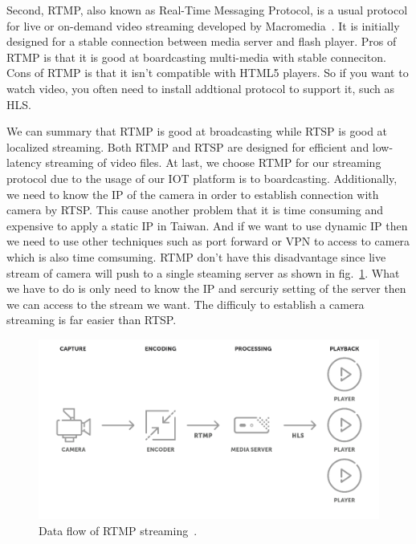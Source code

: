 Second, RTMP, also known as Real-Time Messaging Protocol, is a usual protocol for live or on-demand video streaming developed by Macromedia~\cite{rtmp-inventor}. It is initially designed for a stable connection between media server and flash player. Pros of RTMP is that it is good at boardcasting multi-media with stable conneciton. Cons of RTMP is that it isn’t compatible with HTML5 players. So if you want to watch video, you often need to install addtional protocol to support it, such as HLS.

We can summary that RTMP is good at broadcasting while RTSP is good at localized streaming. Both RTMP and RTSP are designed for efficient and low-latency streaming of video files. At last, we choose RTMP for our streaming protocol due to the usage of our IOT platform is to boardcasting. Additionally, we need to know the IP of the camera in order to establish connection with camera by RTSP. This cause another problem that it is time consuming and expensive to apply  a static IP in Taiwan. And if we want to use dynamic IP then we need to use other techniques such as port forward or VPN to access to camera which is also time comsuming. RTMP don't have this disadvantage since live stream of camera will push to a single steaming server as shown in fig.~\ref{fig:rtmp-data-flow}. What we have to do is only need to know the IP and sercuriy setting of the server then we can access to the stream we want. The difficuly to establish a camera streaming is far easier than RTSP.

\begin{figure}[H]
    \centering
    \includegraphics[width=\textwidth]{figsrc/rtmp-data-flow.png}
    \caption{Data flow of RTMP streaming~\cite{rtmp-intro-01}.\label{fig:rtmp-data-flow}}
\end{figure}


